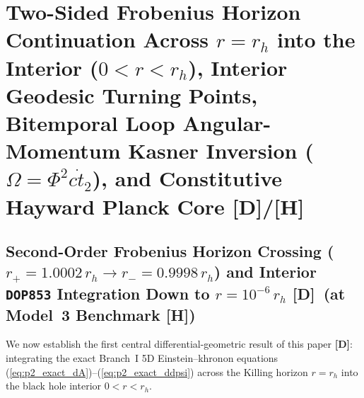 \documentclass[11pt,a4paper]{article}
\newcommand{\catD}{\textbf{\textcolor{blue!75!black}{[D]}}}
\newcommand{\catH}{\textbf{\textcolor{orange!85!black}{[H]}}}
\theoremstyle{plain}
\theoremstyle{definition}
\theoremstyle{remark}
\numberwithin{equation}{section}
\begin{document}
\section{\texorpdfstring{Two-Sided Frobenius Horizon Continuation Across $r = r_h$ into the Interior ($0 < r < r_h$), Interior Geodesic Turning Points, Bitemporal Loop Angular-Momentum Kasner Inversion ($\Omega = \Phi^2 c\dot{t}_2$), and Constitutive Hayward Planck Core \catD/\catH}{Two-Sided Frobenius Horizon Continuation Across r = r_h into the Interior, Interior Geodesic Turning Points, Bitemporal Loop Angular-Momentum Kasner Inversion, and Constitutive Hayward Planck Core}}

\subsection{\texorpdfstring{Second-Order Frobenius Horizon Crossing ($r_+ = 1.0002\,r_h \to r_- = 0.9998\,r_h$) and Interior \texttt{DOP853} Integration Down to $r = 10^{-6}\,r_h$ \catD\ (at Model~3 Benchmark \catH)}{Second-Order Frobenius Horizon Crossing and Interior DOP853 Integration Down to r = 10^-6 r_h}}

We now establish the first central differential-geometric result of this paper \catD: integrating the exact Branch~I 5D Einstein--khronon equations (\ref{eq:p2_exact_dA})--(\ref{eq:p2_exact_ddpsi}) across the Killing horizon $r = r_h$ into the black hole interior $0 < r < r_h$.
\end{document}
